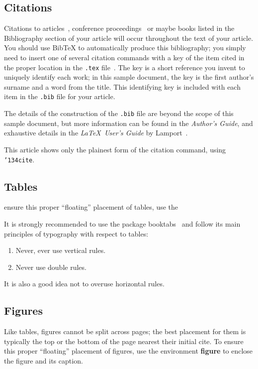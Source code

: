 \subsection{Citations}
Citations to articles~\cite{bowman:reasoning,
clark:pct, braams:babel, herlihy:methodology},
conference proceedings~\cite{clark:pct} or maybe
books \cite{Lamport:LaTeX, salas:calculus} listed
in the Bibliography section of your
article will occur throughout the text of your article.
You should use BibTeX to automatically produce this bibliography;
you simply need to insert one of several citation commands with
a key of the item cited in the proper location in
the \texttt{.tex} file~\cite{Lamport:LaTeX}.
The key is a short reference you invent to uniquely
identify each work; in this sample document, the key is
the first author's surname and a
word from the title.  This identifying key is included
with each item in the \texttt{.bib} file for your article.

The details of the construction of the \texttt{.bib} file
are beyond the scope of this sample document, but more
information can be found in the \textit{Author's Guide},
and exhaustive details in the \textit{\LaTeX\ User's
Guide} by Lamport~.


This article shows only the plainest form
of the citation command, using \texttt{{\char'134}cite}.

\subsection{Tables}
ensure this proper ``floating'' placement of tables, use the


It is strongly recommended to use the package booktabs~\cite{Fear05}
and follow its main principles of typography with respect to tables:
\begin{enumerate}
\item Never, ever use vertical rules.
\item Never use double rules.
\end{enumerate}
It is also a good idea not to overuse horizontal rules.


\subsection{Figures}

Like tables, figures cannot be split across pages; the best placement
for them is typically the top or the bottom of the page nearest their
initial cite.  To ensure this proper ``floating'' placement of
figures, use the environment \textbf{figure} to enclose the figure and
its caption.

